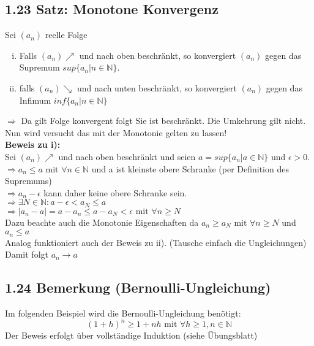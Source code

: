 \documentclass[12pt]{article}
\begin{document}
\subsection*{1.23 Satz: Monotone Konvergenz}
Sei $(a_n)$ reelle Folge

\begin{enumerate}[i)]
\item Falls $(a_n) \nearrow $ und nach oben beschränkt, so konvergiert $(a_n)$ gegen das Supremum $sup\{a_n| n \in \mathbb{N}\}$.
\item falls $(a_n) \searrow$ und nach unten beschränkt, so konvergiert $(a_n)$ gegen das Infimum $inf\{a_n | n \in \mathbb{N}\}$ 
\end{enumerate}
$\Rightarrow$ Da gilt Folge konvergent folgt Sie ist beschränkt. Die Umkehrung gilt nicht. Nun wird versucht das mit der Monotonie gelten zu lassen!\\

\textbf{Beweis zu i):}\\
Sei $(a_n) \nearrow $ und nach oben beschränkt und seien $a=sup\{a_n | a \in \mathbb{N}\} \text{ und } \epsilon > 0$. \\
$\Rightarrow a_n \leq a \text{ mit } \forall n \in \mathbb{N}$ und a ist kleinste obere Schranke (per Definition des Supremums)\\
$\Rightarrow a_n - \epsilon$ kann daher keine obere Schranke sein. \\
$\Rightarrow \exists N \in \mathbb{N} : a - \epsilon < a_N \leq a$\\
$ \Rightarrow | a_n - a| = a- a_n \leq a - a_N < \epsilon \text{ mit } \forall n \geq N$\\
Dazu beachte auch die Monotonie Eigenschaften da  $a_n \geq a_N \text{ mit } \forall n \geq N$ und $a_n \leq a$ \\
Analog funktioniert auch der Beweis zu ii). (Tausche einfach die Ungleichungen)\\
Damit folgt $a_n \rightarrow a$\\


\subsection*{1.24 Bemerkung (Bernoulli-Ungleichung)}
Im folgenden Beispiel wird die Bernoulli-Ungleichung benötigt:
$$ (1 + h)^n \geq 1+nh \text{  mit } \forall h \geq 1, n \in \mathbb{N}$$
Der Beweis erfolgt über vollständige Induktion (siehe Übungsblatt)
\end{document}

